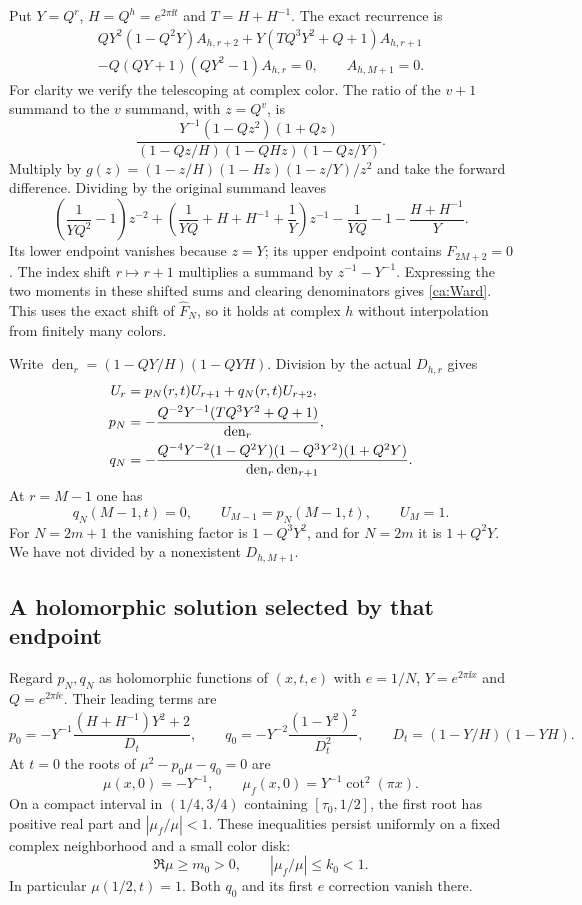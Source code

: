 Put $Y=Q^r$, $H=Q^h=e^{2\pi\ii t}$ and $T=H+H^{-1}$. The exact recurrence is
\begin{multline}\label{ca:Ward}
 QY^2(1-Q^2Y)A_{h,r+2}
 +Y(TQ^3Y^2+Q+1)A_{h,r+1}\\
 -Q(QY+1)(QY^2-1)A_{h,r}=0,\qquad A_{h,M+1}=0.
\end{multline}
For clarity we verify the telescoping at complex color. The ratio of the $v+1$ summand to the $v$ summand, with $z=Q^v$, is
\[
 \frac{Y^{-1}(1-Qz^2)(1+Qz)}
 {(1-Qz/H)(1-QHz)(1-Qz/Y)}.
\]
Multiply by $g(z)=(1-z/H)(1-Hz)(1-z/Y)/z^2$ and take the forward difference. Dividing by the original summand leaves
\[
 \left(\frac1{YQ^2}-1\right)z^{-2}
 +\left(\frac1{YQ}+H+H^{-1}+\frac1Y\right)z^{-1}
 -\frac1{YQ}-1-\frac{H+H^{-1}}Y.
\]
Its lower endpoint vanishes because $z=Y$; its upper endpoint contains
$F_{2M+2}=0$. The index shift $r\mapsto r+1$ multiplies a summand by
$z^{-1}-Y^{-1}$. Expressing the two moments in these shifted sums and clearing denominators gives \eqref{ca:Ward}. This uses the exact shift of $\widehat F_N$, so it holds at complex $h$ without interpolation from finitely many colors.

Write $\operatorname{den}_r=(1-QY/H)(1-QYH)$. Division by the actual $D_{h,r}$ gives
\begin{align}
 U_r&=p_N(r,t)U_{r+1}+q_N(r,t)U_{r+2},\label{ca:recurrence}\\
 p_N&=-\frac{Q^{-2}Y^{-1}(TQ^3Y^2+Q+1)}
                 {\operatorname{den}_r},\notag\\
 q_N&=-\frac{Q^{-4}Y^{-2}(1-Q^2Y)(1-Q^3Y^2)(1+Q^2Y)}
                 {\operatorname{den}_r\operatorname{den}_{r+1}}.\notag
\end{align}
At $r=M-1$ one has
\begin{equation}\label{ca:wall}
 q_N(M-1,t)=0,\qquad U_{M-1}=p_N(M-1,t),\qquad U_M=1.
\end{equation}
For $N=2m+1$ the vanishing factor is $1-Q^3Y^2$, and for $N=2m$ it is $1+Q^2Y$. We have not divided by a nonexistent $D_{h,M+1}$.

\subsection{A holomorphic solution selected by that endpoint}

Regard $p_N,q_N$ as holomorphic functions of $(x,t,e)$ with
$e=1/N$, $Y=e^{2\pi\ii x}$ and $Q=e^{2\pi\ii e}$. Their leading terms are
\begin{equation}\label{ca:leading-pq}
 p_0=-Y^{-1}\frac{(H+H^{-1})Y^2+2}{D_t},\qquad
 q_0=-Y^{-2}\frac{(1-Y^2)^2}{D_t^2},\qquad
 D_t=(1-Y/H)(1-YH).
\end{equation}
At $t=0$ the roots of $\mu^2-p_0\mu-q_0=0$ are
\[
 \mu(x,0)=-Y^{-1},\qquad \mu_f(x,0)=Y^{-1}\cot^2(\pi x).
\]
On a compact interval in $(1/4,3/4)$ containing $[\tau_0,1/2]$, the first root has positive real part and
$|\mu_f/\mu|<1$. These inequalities persist uniformly on a fixed complex neighborhood and a small color disk:
\begin{equation}\label{ca:root-gap}
 \Re\mu\ge m_0>0,\qquad |\mu_f/\mu|\le k_0<1.
\end{equation}
In particular $\mu(1/2,t)=1$. Both $q_0$ and its first $e$ correction vanish there.

